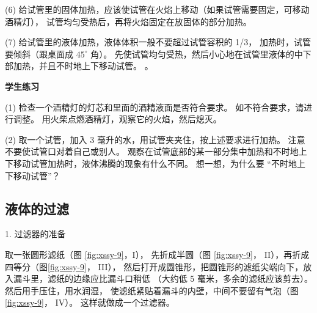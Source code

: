 (6) 给试管里的固体加热，应该使试管在火焰上移动（如果试管需要固定，可移动酒精灯），
试管均匀受热后，再将火焰固定在放固体的部分加热。

(7) 给试管里的液体加热，液体体积一般不要超过试管容积的 1/3，
加热时，试管要倾斜（跟桌面成 $45^\circ$ 角）。
先使试管均匀受热，然后小心地在试管里液体的中下部加热，并且不时地上下移动试管。
。

\textbf{学生练习}

(1) 检查一个酒精灯的灯芯和里面的酒精液面是否符合要求。
如不符合要求，请进行调整。
用火柴点燃酒精灯，观察它的火焰，然后熄灭。

(2) 取一个试管，加入 3 毫升的水，用试管夹夹住，按上述要求进行加热。
注意不要使试管口对着自己或别人。
观察在试管底部的某一部分集中加热和不时地上下移动试管加热时，液体沸腾的现象有什么不同。
想一想，为什么要 “不时地上下移动试管”？


\subsection{液体的过滤}

1. 过滤器的准备

取一张圆形滤纸（图 \ref{fig:xssy-9}，I）， 先折成半圆（图 \ref{fig:xssy-9}， II），再折成四等分（图\ref{fig:xssy-9}， III），
然后打开成圆锥形，把圆锥形的滤纸尖端向下，放入漏斗里，滤纸的边缘应比漏斗口稍低
（大约低 5 毫米，多余的滤纸应该剪去）。然后用手压住，用水润湿，
使滤纸紧贴着漏斗的内壁，中间不要留有气泡（图 \ref{fig:xssy-9}， IV）。
这样就做成一个过滤器。

